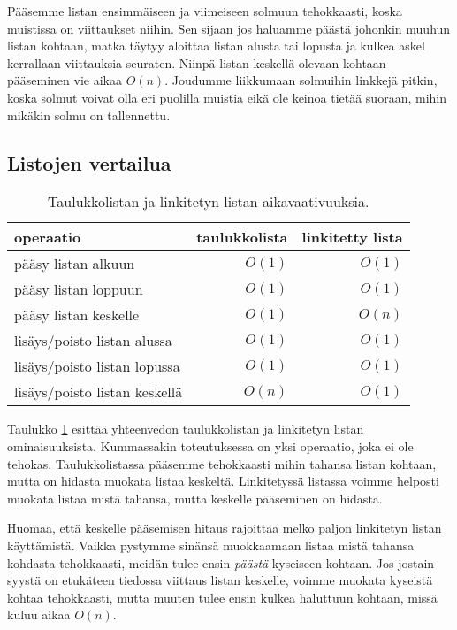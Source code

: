 Pääsemme listan ensimmäiseen ja viimeiseen solmuun tehokkaasti,
koska muistissa on viittaukset niihin.
Sen sijaan jos haluamme päästä johonkin muuhun listan kohtaan,
matka täytyy aloittaa listan alusta tai lopusta ja kulkea askel
kerrallaan viittauksia seuraten.
Niinpä listan keskellä olevaan kohtaan pääseminen vie aikaa $O(n)$.
Joudumme liikkumaan solmuihin linkkejä pitkin, koska solmut voivat
olla eri puolilla muistia eikä ole keinoa tietää suoraan,
mihin mikäkin solmu on tallennettu.

\subsection{Listojen vertailua}

\begin{table}
\center
\begin{tabular}{lrr}
operaatio & taulukkolista & linkitetty lista \\
\hline
pääsy listan alkuun & $O(1)$ & $O(1)$ \\
pääsy listan loppuun & $O(1)$ & $O(1)$ \\ 
pääsy listan keskelle &  $O(1)$ & $O(n)$ \\
lisäys/poisto listan alussa & $O(1)$ & $O(1)$ \\
lisäys/poisto listan lopussa & $O(1)$ & $O(1)$ \\ 
lisäys/poisto listan keskellä &  $O(n)$ & $O(1)$ \\
\end{tabular}
\caption{Taulukkolistan ja linkitetyn listan aikavaativuuksia.}
\label{tab:taulin}
\end{table}

Taulukko \ref{tab:taulin} esittää yhteenvedon taulukkolistan ja
linkitetyn listan ominaisuuksista.
Kummassakin toteutuksessa on yksi operaatio,
joka ei ole tehokas.
Taulukkolistassa pääsemme tehokkaasti mihin tahansa listan
kohtaan, mutta on hidasta muokata listaa keskeltä.
Linkitetyssä listassa voimme helposti muokata listaa mistä tahansa,
mutta keskelle pääseminen on hidasta.

Huomaa, että keskelle pääsemisen hitaus rajoittaa melko paljon
linkitetyn listan käyttämistä.
Vaikka pystymme sinänsä muokkaamaan listaa mistä tahansa kohdasta
tehokkaasti, meidän tulee ensin \emph{päästä} kyseiseen kohtaan.
Jos jostain syystä on etukäteen tiedossa viittaus listan keskelle,
voimme muokata kyseistä kohtaa tehokkaasti,
mutta muuten tulee ensin kulkea haluttuun kohtaan,
missä kuluu aikaa $O(n)$.

